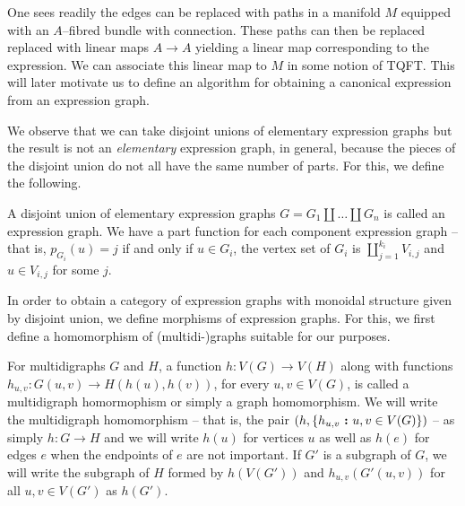 \documentclass[./Thick_TQFTs_and_Quantum_Information.tex]{subfiles}
\begin{document}
\begin{exm}
One sees readily the edges can be replaced with paths in a manifold $M$ equipped
with an $A$--fibred bundle with connection. These paths can then be replaced
replaced with linear maps $A \to A$ yielding a linear map corresponding to the
expression. We can associate this linear map to $M$ in some notion of TQFT. This
will later motivate us to define an algorithm for obtaining a canonical
expression from an expression graph.
\end{exm}

We observe that we can take disjoint unions of elementary expression graphs but
the result is not an \textit{elementary} expression graph, in general, because
the pieces of the disjoint union do not all have the same number of parts. For
this, we define the following.

\begin{defn}
A disjoint union of elementary expression graphs
$G = G_1 \amalg \dots \amalg G_n$ is called an expression graph. We have a part
function for each component expression graph -- that is, $p_{G_i}(u) = j$ if and
only if $u \in G_i$, the vertex set of $G_i$ is $\coprod_{j = 1}^{k_i} V_{i, j}$
and $u \in V_{i, j}$ for some $j$.
\end{defn}

In order to obtain a category of expression graphs with monoidal structure given
by disjoint union, we define morphisms of expression graphs. For this, we first
define a homomorphism of (multidi-)graphs suitable for our purposes.

\begin{defn}
For multidigraphs $G$ and $H$, a function $h : V(G) \to V(H)$ along with
functions $h_{u, v} : G(u, v) \to H(h(u), h(v))$, for every $u, v \in V(G)$,
is called a multidigraph homormophism or simply a graph homomorphism. We will
write the multidigraph homomorphism -- that is, the pair
$(h, \set[h_{u, v}]{u, v \in V(G)})$ -- as simply $h : G \to H$ and we will
write $h(u)$ for vertices $u$ as well as $h(e)$ for edges $e$ when the endpoints
of $e$ are not important. If $G'$ is a subgraph of $G$, we will write the
subgraph of $H$ formed by $h(V(G'))$ and $h_{u, v}(G'(u, v))$ for all
$u, v \in V(G')$ as $h(G')$.
\end{defn}
\end{document}
